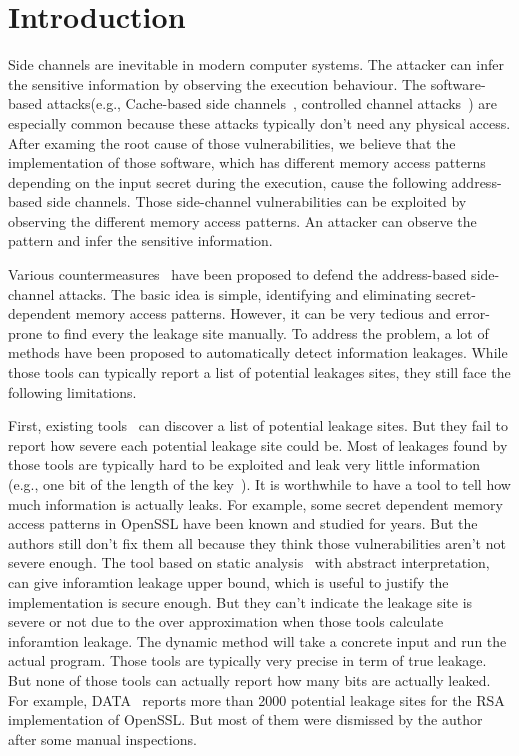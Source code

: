 \section{Introduction}

Side channels are inevitable in modern computer systems. The attacker can infer the sensitive 
information by observing the execution behaviour. The software-based attacks(e.g., Cache-based 
side channels~\cite{184415,191010,7163050,Osvik:2006:CAC:2117739.2117741}, 
controlled channel attacks~\cite{7163052}) 
are especially common because these attacks typically don't need any physical access. 
After examing the root cause of those vulnerabilities, we believe that the implementation 
of those software, which has different memory access patterns depending on the input secret 
during the execution, cause the following address-based side channels. Those side-channel
vulnerabilities can be exploited by observing the different memory access patterns. An
attacker can observe the pattern and infer the sensitive information.

Various countermeasures~\cite{182946,203878,217537} have been proposed to defend the 
address-based side-channel attacks. The basic idea is simple, identifying 
and eliminating secret-dependent memory access patterns. 
However, it can be very tedious and error-prone to find every the leakage site manually. 
To address the problem, a lot of methods have been proposed to automatically detect information leakages. 
While those tools can typically report a list of potential leakages sites, they still 
face the following limitations.

First, existing tools~\cite{203878, 217537} can discover a list of potential leakage sites. 
But they fail to report how severe each potential leakage site could be. Most of leakages 
found by those tools are typically hard to be exploited and leak very little information 
(e.g., one bit of the length of the key~\cite{203878}).  
It is worthwhile to have a tool to tell how much information is actually leaks. 
For example, some secret dependent memory access patterns in OpenSSL have been known 
and studied for years. But the authors still don't fix them all because they think 
those vulnerabilities aren’t not severe enough. The tool based on static analysis~\cite{182946} with 
abstract interpretation, can give inforamtion leakage upper bound, which is useful to 
justify the implementation is secure enough. But they can’t indicate the leakage site 
is severe or not due to the over approximation when those tools calculate inforamtion leakage. 
The dynamic method will take a concrete input and run the actual program. 
Those tools are typically very precise in term of true leakage. But none of those tools 
can actually report how many bits are actually leaked. For example, DATA~\cite{217537} reports more 
than 2000 potential leakage sites for the RSA implementation of OpenSSL. But most of 
them were dismissed by the author after some manual inspections.

